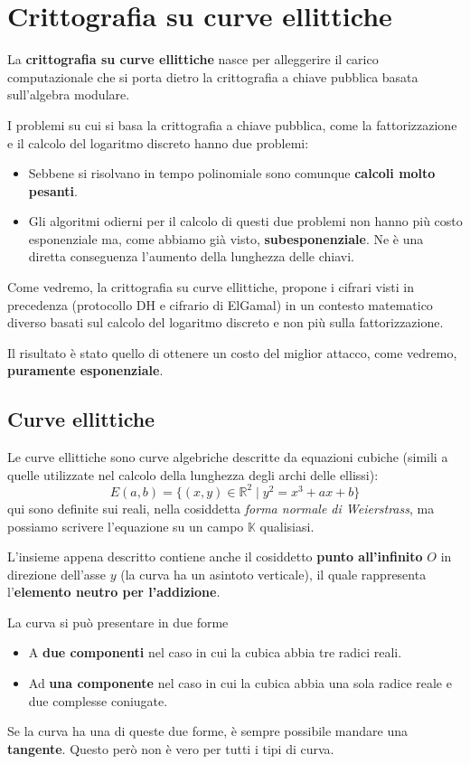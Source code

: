 \chapter{Crittografia su curve ellittiche}

La \textbf{crittografia su curve ellittiche} nasce per alleggerire il carico
computazionale che si porta dietro la crittografia a chiave pubblica basata
sull'algebra modulare.

I problemi su cui si basa la crittografia a chiave pubblica, come la fattorizzazione e il calcolo del logaritmo
discreto hanno due problemi:
\begin{itemize}
	\item Sebbene si risolvano in tempo polinomiale sono comunque \textbf{calcoli molto pesanti}.
	\item Gli algoritmi odierni per il calcolo di questi due problemi non hanno pi\`u costo esponenziale ma,
	      come abbiamo gi\`a visto, \textbf{subesponenziale}. Ne \`e una diretta conseguenza l'aumento della
	      lunghezza delle chiavi.
\end{itemize}
Come vedremo, la crittografia su curve ellittiche, propone i cifrari visti in precedenza (protocollo DH e cifrario
di ElGamal) in un contesto matematico diverso basati sul calcolo del logaritmo discreto e non pi\`u sulla
fattorizzazione.

Il risultato \`e stato quello di ottenere un costo del miglior attacco, come vedremo, \textbf{puramente esponenziale}.

\section{Curve ellittiche}
Le curve ellittiche sono curve algebriche descritte da equazioni cubiche (simili a quelle utilizzate nel calcolo
della lunghezza degli archi delle ellissi):
\[ E(a, b) = \{ (x, y) \in \mathbb{R}^2 \mid y^2 = x^3 + ax + b \} \]
qui sono definite sui reali, nella cosiddetta \emph{forma normale di Weierstrass}, ma possiamo scrivere l'equazione
su un campo $\mathbb{K}$ qualisiasi.

L'insieme appena descritto contiene anche il cosiddetto \textbf{punto all'infinito} $O$ in direzione dell'asse $y$
(la curva ha un asintoto verticale), il quale rappresenta l'\textbf{elemento neutro per l'addizione}.

La curva si pu\`o presentare in due forme
\begin{itemize}
	\item A \textbf{due componenti} nel caso in cui la cubica abbia tre radici reali.
	\item Ad \textbf{una componente} nel caso in cui la cubica abbia una sola radice reale e due complesse
	      coniugate.
\end{itemize}
Se la curva ha una di queste due forme, \`e sempre possibile mandare una \textbf{tangente}. Questo per\`o non \`e
vero per tutti i tipi di curva.

